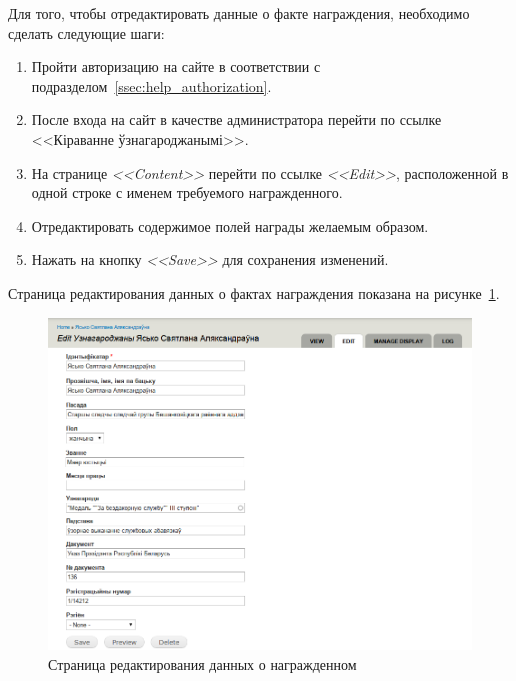 Для того, чтобы отредактировать данные о факте награждения,
необходимо сделать следующие шаги:

\begin{enumerate}
\item Пройти авторизацию на сайте в соответствии с подразделом~\ref{ssec:help_authorization}.
\item После входа на сайт в качестве администратора
   перейти по ссылке <<Кіраванне ўзнагароджанымі>>.
\item На странице \textit{<<Content>>} перейти по ссылке \textit{<<Edit>>},
  расположенной в одной строке с именем требуемого награжденного.
\item Отредактировать содержимое полей награды желаемым образом.
\item Нажать на кнопку \textit{<<Save>>} для сохранения изменений.
\end{enumerate}

Страница редактирования данных о фактах награждения показана 
на рисунке~\ref{fig:awarded_edit_page}.

\begin{figure}[h]
  \centering
  \includegraphics[width=150mm]{pic/awarded_edit_page.png}
  \caption{Страница редактирования данных о награжденном}
  \label{fig:awarded_edit_page}
\end{figure}
